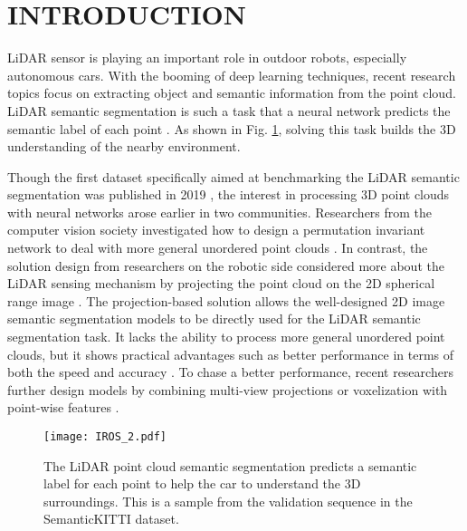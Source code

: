 \documentclass[letterpaper, 10 pt, conference]{ieeeconf}
\begin{document}
\section{INTRODUCTION}


LiDAR sensor is playing an important role in outdoor robots, especially autonomous cars. With the booming of deep learning techniques, recent research topics focus on extracting object and semantic information from the point cloud. LiDAR semantic segmentation is such a task that a neural network predicts the semantic label of each point \cite{milioto2019rangenet++}. As shown in Fig. \ref{fig:fisrt}, solving this task builds the 3D understanding of the nearby environment.

Though the first dataset specifically aimed at benchmarking the LiDAR semantic segmentation was published in 2019 \cite{behley2019semantickitti}, the interest in processing 3D point clouds with neural networks arose earlier in two communities. Researchers from the computer vision society investigated how to design a permutation invariant network to deal with more general unordered point clouds \cite{qi2017pointnet,qi2017pointnet++}. In contrast, the solution design from researchers on the robotic side considered more about the LiDAR sensing mechanism by projecting the point cloud on the 2D spherical range image \cite{wu2018squeezeseg}. The projection-based solution allows the well-designed 2D image semantic segmentation models to be directly used for the LiDAR semantic segmentation task. It lacks the ability to process more general unordered point clouds, but it shows practical advantages such as better performance in terms of both the speed and accuracy \cite{hu2020randla, cortinhal2020salsanext}. To chase a better performance, recent researchers further design models by combining multi-view projections or voxelization with point-wise features \cite{cheng20212, zhang2020deep, alnaggar2021multi}.


\begin{figure}
\texttt{[image: IROS\_2.pdf]}
    \caption{The LiDAR point cloud semantic segmentation predicts a semantic label for each point to help the car to understand the 3D surroundings. This is a sample from the validation sequence in the SemanticKITTI dataset.}
    \label{fig:fisrt}
    \vspace{-6mm}
\end{figure}
\end{document}
